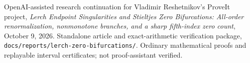 OpenAI-assisted research continuation for Vladimir Reshetnikov's ProveIt project,
\emph{Lerch Endpoint Singularities and Stieltjes Zero Bifurcations:
All-order renormalization, nonmonotone branches, and a sharp fifth-index zero count},
October 9, 2026. Standalone article and exact-arithmetic verification package,
\texttt{docs/reports/lerch-zero-bifurcations/}. Ordinary mathematical proofs
and replayable interval certificates; not proof-assistant verified.
